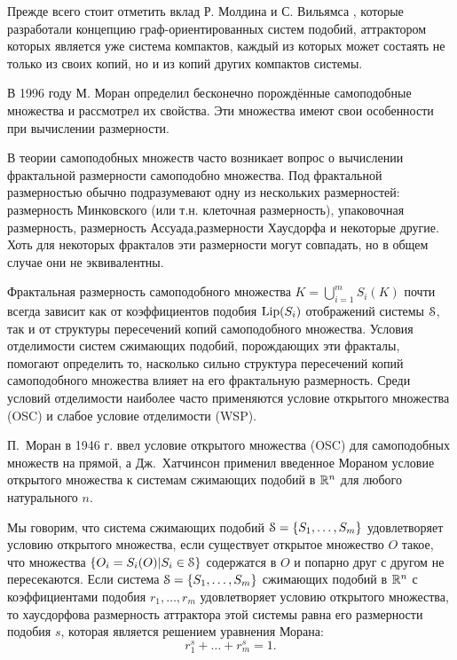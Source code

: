 Прежде всего стоит отметить вклад Р. Молдина и С. Вильямса \cite{MW1988}, которые разработали концепцию граф-ориентированных систем подобий, аттрактором которых является уже система компактов, каждый из которых может состаять не только из своих копий, но и из копий других компактов системы.

В 1996 году М. Моран \cite{Moran1996} определил бесконечно порождённые самоподобные множества и рассмотрел их свойства.
Эти множества имеют свои особенности при вычислении размерности.

В теории самоподобных множеств часто возникает вопрос о вычислении фрактальной размерности самоподобно множества.
Под фрактальной размерностью обычно подразумевают одну из нескольких размерностей: размерность Минковского (или т.н. клеточная размерность), упаковочная размерность, размерность Ассуада,размерности Хаусдорфа и некоторые другие.
Хоть для некоторых фракталов эти размерности могут совпадать, но в общем случае они не эквивалентны.

Фрактальная размерность самоподобного множества $K=\bigcup_{i=1}^mS_i(K)$ почти всегда зависит как от коэффициентов подобия $\mathop{\rm Lip} \nolimits(S_i)$ отображений системы ${\EuScript S}$, так и от структуры пересечений копий самоподобного множества.
Условия отделимости систем сжимающих подобий, порождающих эти фракталы, помогают определить то, насколько сильно структура пересечений копий самоподобного множества влияет на его фрактальную размерность.
Среди условий отделимости наиболее часто применяются условие открытого множества (OSC) и слабое условие отделимости (WSP).


П.~Моран в 1946 г. \cite{Moran1946} ввел условие открытого множества (OSC) для самоподобных множеств на прямой, а Дж.~Хатчинсон \cite{Hut1981} применил введенное Мораном условие открытого множества к системам сжимающих подобий в $\mathbb{R}^n$ для любого натурального $n$.

Мы говорим, что система сжимающих подобий ${\EuScript S}=\{S_1, \ldots, S_m\}$ удовлетворяет условию открытого множества, если существует открытое множество $O$ такое, что множества $\{O_i=S_i(O) | S_i\in{\EuScript S}\}$ содержатся в $O$ и попарно друг с другом не пересекаются.
Если система ${\EuScript S}=\{S_1,\ldots,S_m\}$ сжимающих подобий в $\mathbb{R}^n$ с коэффициентами подобия $r_1, \ldots, r_m$ удовлетворяет условию открытого множества, то хаусдорфова размерность аттрактора этой системы равна его размерности подобия $s$, которая является решением уравнения Морана: $$r_1^s+\ldots+r_m^s=1.$$ 

